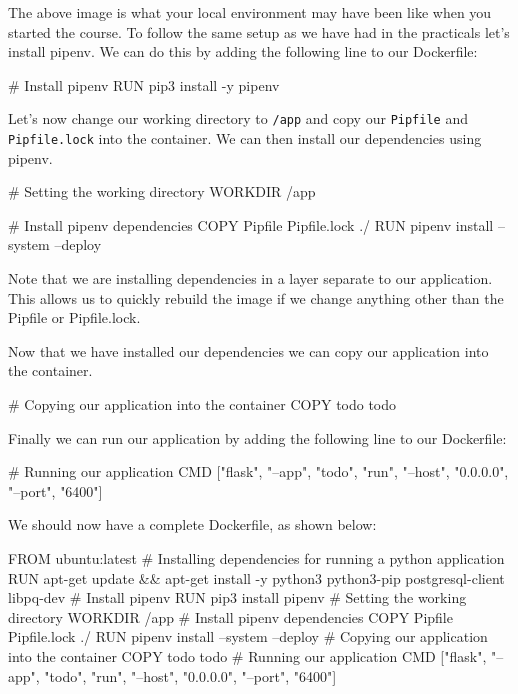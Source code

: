 \documentclass{csse4400}
\begin{document}
The above image is what your local environment may have been like when you started the course.
To follow the same setup as we have had in the practicals let's install pipenv.
We can do this by adding the following line to our Dockerfile:

\begin{code}[language=docker,numbers=none]{}
# Install pipenv
RUN pip3 install -y pipenv
\end{code}

Let's now change our working directory to \texttt{/app} and copy our \texttt{Pipfile} and \texttt{Pipfile.lock} into the container.
We can then install our dependencies using pipenv.

\begin{code}[language=docker,numbers=none]{}
# Setting the working directory
WORKDIR /app

# Install pipenv dependencies
COPY Pipfile Pipfile.lock ./
RUN pipenv install --system --deploy
\end{code}

Note that we are installing dependencies in a layer separate to our application.
This allows us to quickly rebuild the image if we change anything other than the Pipfile or Pipfile.lock.

Now that we have installed our dependencies we can copy our application into the container.

\begin{code}[language=docker,numbers=none]{}
# Copying our application into the container
COPY todo todo
\end{code}

Finally we can run our application by adding the following line to our Dockerfile:

\begin{code}[language=docker,numbers=none]{}
# Running our application
CMD ["flask", "--app", "todo", "run", "--host", "0.0.0.0", "--port", "6400"]
\end{code}

We should now have a complete Dockerfile, as shown below:

\begin{code}[language=docker,numbers=none]{}
  FROM ubuntu:latest
  # Installing dependencies for running a python application
  RUN apt-get update && apt-get install -y python3 python3-pip postgresql-client libpq-dev
  # Install pipenv
  RUN pip3 install pipenv
  # Setting the working directory
  WORKDIR /app
  # Install pipenv dependencies
  COPY Pipfile Pipfile.lock ./
  RUN pipenv install --system --deploy
  # Copying our application into the container
  COPY todo todo
  # Running our application
  CMD ["flask", "--app", "todo", "run", "--host", "0.0.0.0", "--port", "6400"]
\end{code}
\end{document}
